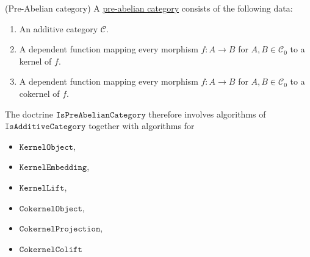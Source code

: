 \begin{definition}{(Pre-Abelian category)}
A \ul{pre-abelian category} consists of the following data:
\begin{enumerate}
\renewcommand{\labelenumi}{(\theenumi)}
\item An additive category $\mathcal{C}$.
\item A dependent function mapping every morphism $f : A \rightarrow B$ for $A, B \in \mathcal{C}_{0}$ to a
kernel of $f$.
\item A dependent function mapping every morphism $f : A \rightarrow B$ for $A, B \in \mathcal{C}_{0}$ to a
cokernel of $f$.
\end{enumerate}
\end{definition}

\begin{doctrine}\label{doc:pre-abelian}
The doctrine $\mathtt{IsPreAbelianCategory}$ therefore involves algorithms of $\mathtt{IsAdditiveCategory}$ together with algorithms for
\begin{itemize}
\item $\mathtt{KernelObject}$,
\item $\mathtt{KernelEmbedding}$,
\item $\mathtt{KernelLift}$,
\item $\mathtt{CokernelObject}$,
\item $\mathtt{CokernelProjection}$,
\item $\mathtt{CokernelColift}$
\end{itemize}
\end{doctrine}


